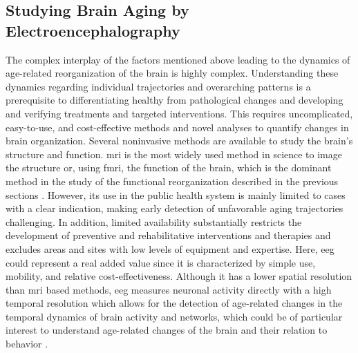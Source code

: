 \subsection{Studying Brain Aging by Electroencephalography}
\label{theory:aging:EEG}
The complex interplay of the factors mentioned above leading to the dynamics of age-related reorganization of the brain is highly complex. Understanding these dynamics regarding individual trajectories and overarching patterns is a prerequisite to differentiating healthy from pathological changes and developing and verifying treatments and targeted interventions. This requires uncomplicated, easy-to-use, and cost-effective methods and novel analyses to quantify changes in brain organization. Several noninvasive methods are available to study the brain's structure and function. \Gls{mri} is the most widely used method in science to image the structure or, using \gls{fmri}, the function of the brain, which is the dominant method in the study of the functional reorganization described in the previous sections \cite{Reuter-Lorenz2010}. However, its use in the public health system is mainly limited to cases with a clear indication, making early detection of unfavorable aging trajectories challenging. In addition, limited availability substantially restricts the development of preventive and rehabilitative interventions and therapies and excludes areas and sites with low levels of equipment and expertise. Here, \gls{eeg} could represent a real added value since it is characterized by simple use, mobility, and relative cost-effectiveness. Although it has a lower spatial resolution than \gls{mri} based methods, \gls{eeg} measures neuronal activity directly with a high temporal resolution which allows for the detection of age-related changes in the temporal dynamics of brain activity and networks, which could be of particular interest to understand age-related changes of the brain and their relation to behavior \cite{Courtney2021}.

